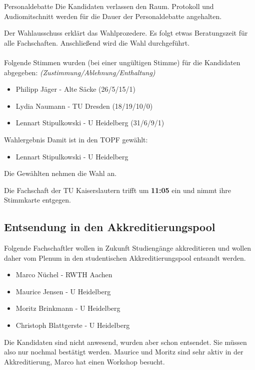     \begin{info}{Personaldebatte}
      Die Kandidaten verlassen den Raum. Protokoll und Audiomitschnitt werden für die Dauer der Personaldebatte angehalten.
    \end{info}

    Der Wahlausschuss erklärt das Wahlprozedere.
    Es folgt etwas Beratungszeit für alle Fachschaften. Anschließend wird die Wahl durchgeführt. \\ \\

    Folgende Stimmen wurden (bei einer ungültigen Stimme) für die Kandidaten abgegeben: \textit{(Zustimmung/Ablehnung/Enthaltung)}
    \begin{itemize}
      \item Philipp Jäger - Alte Säcke  (26/5/15/1)
      \item Lydia Naumann - TU Dresden  (18/19/10/0)
      \item Lennart Stipulkowski - U Heidelberg  (31/6/9/1)
    \end{itemize}

    \begin{success}{Wahlergebnis}
      Damit ist in den TOPF gewählt:
      \begin{itemize}
        \item Lennart Stipulkowski - U Heidelberg 
      \end{itemize}
      \tcblower
      Die Gewählten nehmen die Wahl an.
    \end{success}

    \begin{info}{}
      Die Fachschaft der TU Kaiserslautern trifft um \textbf{11:05} ein und nimmt ihre Stimmkarte entgegen.
    \end{info}

  \subsection{Entsendung in den Akkreditierungspool}
    Folgende Fachschaftler wollen in Zukunft Studiengänge akkreditieren und wollen daher vom Plenum in den studentischen Akkreditierungspool entsandt werden.
    \begin{itemize}
      \item Marco Nüchel - RWTH Aachen
      \item Maurice Jensen - U Heidelberg
      \item Moritz Brinkmann - U Heidelberg
      \item Christoph Blattgerste - U Heidelberg 
    \end{itemize}
    Die Kandidaten sind nicht anwesend, wurden aber schon entsendet. Sie müssen also nur nochmal bestätigt werden. Maurice und Moritz sind sehr aktiv in der Akkreditierung, Marco hat einen Workshop besucht. \\

